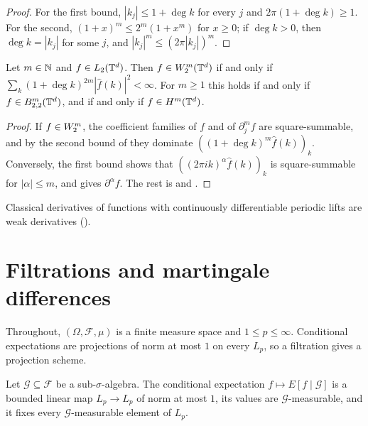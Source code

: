 \begin{proof}
\leanok
For the first bound, $|k_j| \leq 1 + \deg k$ for every $j$ and $2\pi (1 + \deg k) \geq 1$.
For the second, $(1 + x)^m \leq 2^m (1 + x^m)$ for $x \geq 0$; if $\deg k > 0$, then
$\deg k = |k_j|$ for some $j$, and $|k_j|^m \leq (2\pi |k_j|)^m$.
\end{proof}

\begin{theorem}[$\Sob{m}{2}(\T^d) = H^m(\T^d) = \Besov{m}{2}{2}(\T^d)$]
\label{thm:weak-sobolev}
\leanok
{}
Let $m \in \mathbb{N}$ and $f \in L_2(\mathbb{T}^d)$. Then $f \in W^{m}_{2}(\mathbb{T}^d)$ if and only if
$\sum_k (1 + \deg k)^{2m} |\hat f(k)|^2 < \infty$. For $m \geq 1$ this holds if and only if
$f \in B^{m}_{2,2}(\mathbb{T}^d)$, and if and only if $f \in H^m(\mathbb{T}^d)$.
\end{theorem}

\begin{proof}
\leanok
If $f \in W^{m}_{2}$, the coefficient families of $f$ and of $\partial_j^m f$ are
square-summable, and by the second bound of  they dominate
$((1 + \deg k)^m \hat f(k))_k$. Conversely, the first bound shows that
$((2\pi i k)^\alpha \hat f(k))_k$ is square-summable for $|\alpha| \leq m$, and
 gives $\partial^\alpha f$. The rest is
 and .
\end{proof}

Classical derivatives of functions with continuously differentiable periodic lifts are weak
derivatives ().

\chapter{Filtrations and martingale differences}
\label{ch:filtrations}

Throughout, $(\Omega, \mathcal{F}, \mu)$ is a finite measure space and $1 \leq p \leq \infty$.
Conditional expectations are projections of norm at most $1$ on every $L_p$, so a filtration
gives a projection scheme.

\begin{lemma}
\label{lem:condexp-lp}
\leanok
Let $\mathcal{G} \subseteq \mathcal{F}$ be a sub-$\sigma$-algebra. The conditional
expectation $f \mapsto E[f \mid \mathcal{G}]$ is a bounded linear map $L_p \to L_p$ of norm at
most $1$, its values are $\mathcal{G}$-measurable, and it fixes every $\mathcal{G}$-measurable
element of $L_p$.
\end{lemma}

